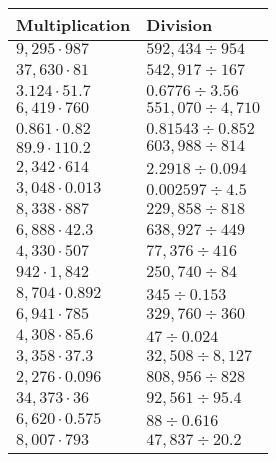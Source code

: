\begin{longtable}[]{@{}ll@{}}
\toprule
Multiplication & Division\tabularnewline
\midrule
\endhead
\(9,295\cdot987\) & \(592,434÷954\)\tabularnewline
\(37,630\cdot81\) & \(542,917÷167\)\tabularnewline
\(3.124\cdot51.7\) & \(0.6776÷3.56\)\tabularnewline
\(6,419\cdot760\) & \(551,070÷4,710\)\tabularnewline
\(0.861\cdot0.82\) & \(0.81543÷0.852\)\tabularnewline
\(89.9\cdot110.2\) & \(603,988÷814\)\tabularnewline
\(2,342\cdot614\) & \(2.2918÷0.094\)\tabularnewline
\(3,048\cdot0.013\) & \(0.002597÷4.5\)\tabularnewline
\(8,338\cdot887\) & \(229,858÷818\)\tabularnewline
\(6,888\cdot42.3\) & \(638,927÷449\)\tabularnewline
\(4,330\cdot507\) & \(77,376÷416\)\tabularnewline
\(942\cdot1,842\) & \(250,740÷84\)\tabularnewline
\(8,704\cdot0.892\) & \(345÷0.153\)\tabularnewline
\(6,941\cdot785\) & \(329,760÷360\)\tabularnewline
\(4,308\cdot85.6\) & \(47÷0.024\)\tabularnewline
\(3,358\cdot37.3\) & \(32,508÷8,127\)\tabularnewline
\(2,276\cdot0.096\) & \(808,956÷828\)\tabularnewline
\(34,373\cdot36\) & \(92,561÷95.4\)\tabularnewline
\(6,620\cdot0.575\) & \(88÷0.616\)\tabularnewline
\(8,007\cdot793\) & \(47,837÷20.2\)\tabularnewline
\bottomrule
\end{longtable}
